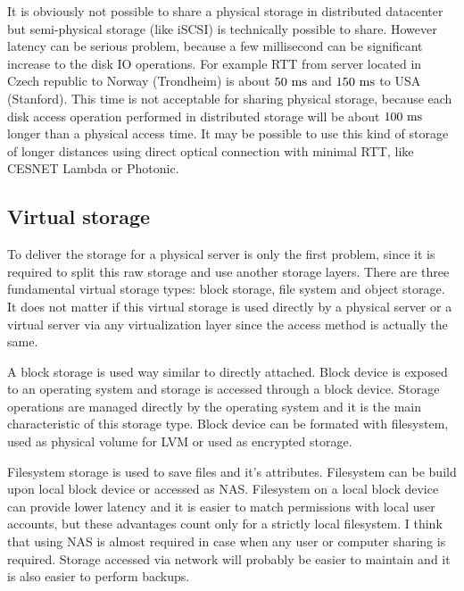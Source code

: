 It is obviously not possible to share a physical storage in distributed datacenter but semi-physical storage (like \Ac{iSCSI}) is technically possible to share. However latency can be serious problem, because a few millisecond can be significant increase to the disk \Ac{IO} operations. For example \Ac{RTT} from server located in Czech republic to Norway (Trondheim) is about $50~\mathrm{ms}$ and $150~\mathrm{ms}$ to USA (Stanford). This time is not acceptable for sharing physical storage, because each disk access operation performed in distributed storage will be about $100~\mathrm{ms}$ longer than a physical access time. It may be possible to use this kind of storage of longer distances using direct optical connection with minimal \Ac{RTT}, like CESNET Lambda or Photonic.

\subsection{Virtual storage}

To deliver the storage for a physical server is only the first problem, since it is required to split this raw storage and use another storage layers. There are three fundamental virtual storage types: block storage, file system and object storage. It does not matter if this virtual storage is used directly by a physical server or a virtual server via any virtualization layer since the access method is actually the same.

A block storage is used way similar to directly attached. Block device is exposed to an operating system and storage is accessed through a block device. Storage operations are managed directly by the operating system and it is the main characteristic of this storage type. Block device can be formated with filesystem, used as physical volume for \Ac{LVM} or used as encrypted storage.

Filesystem storage is used to save files and it's attributes. Filesystem can be build upon local block device or accessed as \Ac{NAS}. Filesystem on a local block device can provide lower latency and it is easier to match permissions with local user accounts, but these advantages count only for a strictly local filesystem. I think that using \Ac{NAS} is almost required in case when any user or computer sharing is required. Storage accessed via network will probably be easier to maintain and it is also easier to perform backups. 

